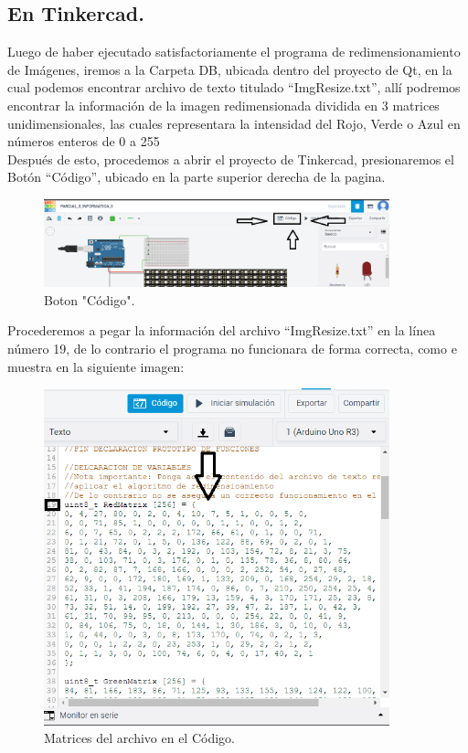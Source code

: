 \documentclass{article}
\begin{document}
\subsection{En Tinkercad.}
Luego de haber ejecutado satisfactoriamente el programa de redimensionamiento de Imágenes, iremos a la Carpeta DB, ubicada dentro del proyecto de Qt, en la cual podemos encontrar archivo de texto titulado “ImgResize.txt”, allí podremos encontrar la información de la imagen redimensionada dividida en 3 matrices unidimensionales, las cuales representara la intensidad del Rojo, Verde o Azul en números enteros de 0 a 255
\\
Después de esto, procedemos a abrir el proyecto de Tinkercad, presionaremos el Botón “Código”, ubicado en la parte superior derecha de la pagina.
\begin{figure}[h]
  \includegraphics[width=10cm]{codigo.PNG}
  \centering
  \caption{Boton "Código".}
  \label{fig:Codigo}
\end{figure}
Procederemos a pegar la información del archivo “ImgResize.txt” en la línea número 19, de lo contrario el programa no funcionara de forma correcta, como e muestra en la siguiente imagen:
\begin{figure}[h]
  \includegraphics[width=10cm]{matrices.PNG}
  \centering
  \caption{Matrices del archivo en el Código.}
  \label{fig:matrices}
\end{figure}
\end{document}
